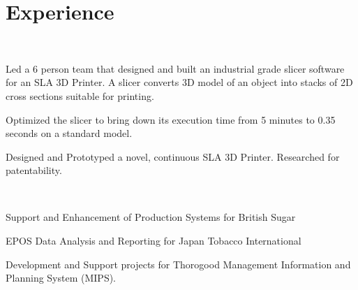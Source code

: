 \documentclass[]{deedy-resume-openfont}
\begin{document}
\hfill
\begin{minipage}[t]{0.66\textwidth} 



\section{Experience}

\\
\vspace{\topsep}
\begin{tightemize}
\item  Led a 6 person team that designed and built an industrial grade slicer software for an SLA 3D Printer. A slicer converts 3D model of an object into stacks of 2D cross sections suitable for printing.
\item Optimized the slicer to bring down its execution time from 5 minutes to 0.35 seconds on a standard model.
\item Designed and Prototyped a novel, continuous SLA 3D Printer. Researched for patentability.
\end{tightemize}

\sectionsep{}

\\
\vspace{\topsep} %
\begin{tightemize}
	\item Support and Enhancement of Production Systems for British Sugar
	\item EPOS Data Analysis and Reporting for Japan Tobacco International
	\item Development and Support projects for Thorogood Management Information and Planning System (MIPS).
\end{tightemize}
\sectionsep




\end{minipage}
\end{document}
